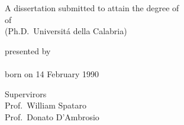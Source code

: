 \begin{titlepage}
    \begin{center}
        \large

        \hfill

        \vfill

        \begingroup
            \spacedallcaps{\myTitle}
        \endgroup

        \vfill

        \begingroup
            A dissertation submitted to attain the degree of\\
            \vspace{0.5em}
            of
             \\
            (Ph.D.\ Universit\'a della Calabria)
        \endgroup

        \vfill

        \begingroup
            presented by\\
            \vspace{0.5em}
            \spacedlowsmallcaps{\myName}\\
            \vspace{0.5em}
            born on 14 February 1990\\
        \endgroup

        \vfill

 \begingroup
      Supervirors\\
    \vspace{0.5em}
     Prof.\ William Spataro\\
     Prof.\ Donato D'Ambrosio
 \endgroup

        \vfill

        \myTime%

        \vfill
    \end{center}
\end{titlepage}
